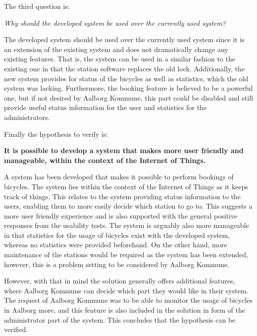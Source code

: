 The third question is:
\begin{center}
	\textit{Why should the developed system be used over the currently used system?}
\end{center}

The developed system should be used over the currently used system since it is an extension of the existing system and does not dramatically change any existing features.
That is, the system can be used in a similar fashion to the existing one in that the station software replaces the old lock. 
Additionally, the new system provides for status of the bicycles as well as statistics, which the old system was lacking. 
Furthermore, the booking feature is believed to be a powerful one, but if not desired by Aalborg Kommune, this part could be disabled and still provide useful status information for the user and statistics for the administrators.

Finally the hypothesis to verify is:
\begin{center}
	\textbf{It is possible to develop a system that makes \bycykel more user friendly and manageable, within the context of the Internet of Things.}
\end{center}

A system has been developed that makes it possible to perform bookings of bicycles.
The system lies within the context of the Internet of Things as it keeps track of things.
This relates to the system providing status information to the users, enabling them to more easily decide which station to go to.
This suggests a more user friendly experience and is also supported with the general positive responses from the usability tests.
The system is arguably also more manageable in that statistics for the usage of bicycles exist with the developed system, whereas no statistics were provided beforehand.
On the other hand, more maintenance of the stations would be required as the system has been extended, however, this is a problem setting to be considered by Aalborg Kommune.
 
However, with that in mind the solution generally offers additional features, where Aalborg Kommune can decide which part they would like in their system.
The request of Aalborg Kommune was to be able to monitor the usage of bicycles in Aalborg more, and this feature is also included in the solution in form of the administrator part of the system.
This concludes that the hypothesis can be verified.
